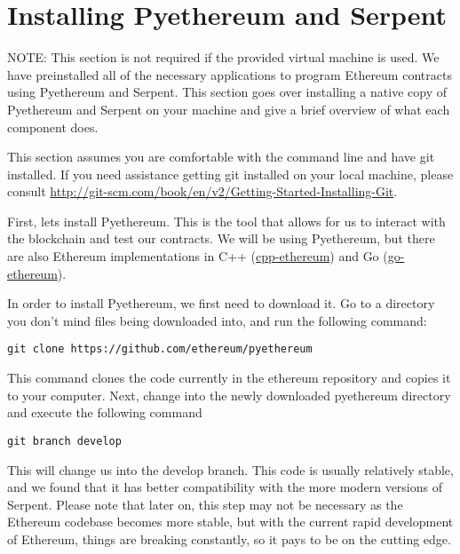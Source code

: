 \documentclass[12pt]{article}
\begin{document}
\section{Installing Pyethereum and Serpent}
\begin{framed}
NOTE: This section is not required if the provided virtual machine is used. We have preinstalled all of the necessary applications to program Ethereum contracts using Pyethereum and Serpent. This section goes over installing a native copy of Pyethereum and Serpent on your machine and give a brief overview of what each component does.
\end{framed}

This section assumes you are comfortable with the command line and have git installed. If you need assistance getting git installed on your local machine, please consult \url{http://git-scm.com/book/en/v2/Getting-Started-Installing-Git}.

First, lets install Pyethereum. This is the tool that allows for us to interact with the blockchain and test our contracts. We will be using Pyethereum, but there are also Ethereum implementations in C++ (\href{https://github.com/ethereum/cpp-ethereum}{cpp-ethereum}) and Go (\href{https://github.com/ethereum/go-ethereum}{go-ethereum}).

In order to install Pyethereum, we first need to download it. Go to a directory you don't mind files being downloaded into, and run the following command:

\begin{lstlisting}
git clone https://github.com/ethereum/pyethereum
\end{lstlisting}

This command clones the code currently in the ethereum repository and copies it to your computer. Next, change into the newly downloaded pyethereum directory and execute the following command

\begin{lstlisting}
git branch develop
\end{lstlisting}

This will change us into the develop branch. This code is usually relatively stable, and we found that it has better compatibility with the more modern versions of Serpent. Please note that later on, this step may not be necessary as the Ethereum codebase becomes more stable, but with the current rapid development of Ethereum, things are breaking constantly, so it pays to be on the cutting edge.
\end{document}
